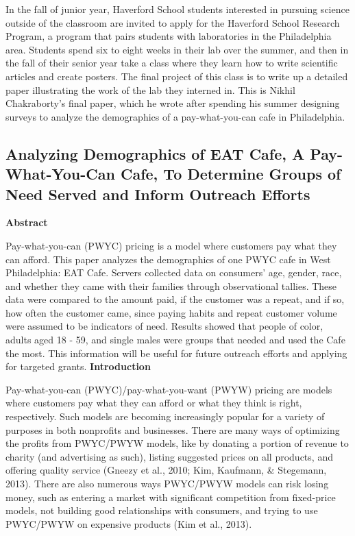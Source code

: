 
In the fall of junior year, Haverford School students interested in pursuing science outside of the classroom are invited to apply for the Haverford School Research Program, a program that pairs students with laboratories in the Philadelphia area. Students spend six to eight weeks in their lab over the summer, and then in the fall of their senior year take a class where they learn how to write scientific articles and create posters. The final project of this class is to write up a detailed paper illustrating the work of the lab they interned in. This is Nikhil Chakraborty’s final paper, which he wrote after spending his summer designing surveys to analyze the demographics of a pay-what-you-can cafe in Philadelphia.

\subsection*{Analyzing Demographics of EAT Cafe, A Pay-What-You-Can Cafe, To Determine Groups of Need Served and Inform Outreach Efforts}

\textbf{Abstract}

Pay-what-you-can (PWYC) pricing is a model where customers pay what they can afford. This paper analyzes the demographics of one PWYC cafe in West Philadelphia: EAT Cafe. Servers collected data on consumers’ age, gender, race, and whether they came with their families through observational tallies. These data were compared to the amount paid, if the customer was a repeat, and if so, how often the customer came, since paying habits and repeat customer volume were assumed to be indicators of need. Results showed that people of color, adults aged 18 - 59, and single males were groups that needed and used the Cafe the most. This information will be useful for future outreach efforts and applying for targeted grants.
\newline\newline\newline\newline
\textbf{Introduction}

Pay-what-you-can (PWYC)/pay-what-you-want (PWYW) pricing are models where customers pay what they can afford or what they think is right, respectively. Such models are becoming increasingly popular for a variety of purposes in both nonprofits and businesses. There are many ways of optimizing the profits from PWYC/PWYW models, like by donating a portion of revenue to charity (and advertising as such), listing suggested prices on all products, and offering quality service (Gneezy et al., 2010; Kim, Kaufmann, \& Stegemann, 2013). There are also numerous ways PWYC/PWYW models can risk losing money, such as entering a market with significant competition from fixed-price models, not building good relationships with consumers, and trying to use PWYC/PWYW on expensive products (Kim et al., 2013).


